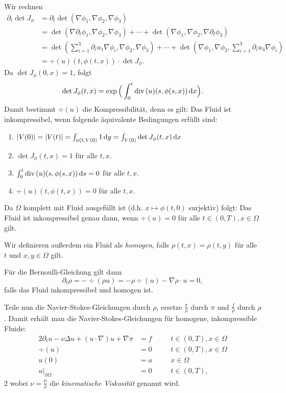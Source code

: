 Wir rechnen
\begin{align*}
  \partial_t \det J_\phi
  &= \partial_t \det (\nabla \phi_1, \nabla \phi_2, \nabla \phi_3) \\
  &= \det (\nabla \partial_t \phi_1, \nabla \phi_2, \nabla \phi_3) + \cdots  +  \det(\nabla\phi_1, \nabla\phi_2, \nabla\partial_t \phi_3) \\
  &= \det( \sum_{i = 1}^3 \partial_i u_1 \nabla \phi_i, \nabla\phi_2, \nabla \phi_3) + \cdots + \det(\nabla\phi_1, \nabla\phi_2, \sum_{i = 1}^3 \partial_i u_3  \nabla \phi_i) \\
  &= \div(u)(t,\phi(t,x)) \cdot \det J_\phi.
\end{align*}
Da $\det J_\phi(0,x) = 1$, folgt 
$$
\det J_\phi(t,x) = \exp\Big( \int_0^t \mathrm{div\,} (u)(s,\phi(s,x))\, {\operatorname{d}\!{x}} \Big).
$$
Damit bestimmt $\div(u)$ die Kompressibilität, denn es gilt:
Das Fluid ist inkompressibel, wenn folgende äquivalente Bedingungen erfüllt sind:
\begin{enumerate}[1)]
  \item $|V(0)| = |V(t)| = \int_{\phi(t,V(0)} 1 \, {\operatorname{d}\!{y}} = \int_{V(0)} \det J_\phi(t,x) \, {\operatorname{d}\!{x}}$
  \item $\det J_\phi(t,x) = 1$ für alle $t, x$.
  \item $\int_0^t \mathrm{div\,} (u)(s,\phi(s,x)) \, {\operatorname{d}\!{s}} = 0$ für alle $t,x$.
  \item $\div(u)(t,\phi(t,x)) = 0$ für alle $t,x$.
\end{enumerate}
Da $\Omega$ komplett mit Fluid ausgefüllt ist (d.h. $x \mapsto \phi(t,0)$ surjektiv) folgt: Das Fluid ist inkompressibel genau dann, wenn $\div(u) = 0$ für alle $t \in (0,T), x \in \Omega$ gilt.

Wir definieren außerdem ein Fluid als \emph{homogen}, falls $\rho(t,x) = \rho(t,y)$ für alle $t$ und $x,y \in \Omega$ gilt.

Für die Bernoulli-Gleichung gilt dann
$$
\partial_t \rho = -\div(\rho u) = -\rho \div(u) - \nabla \rho \cdot u = 0,
$$
falls das Fluid inkompressibel und homogen ist.

Teile nun die Navier-Stokes-Gleichungen durch $\rho$, ersetze $\frac{\pi}{\rho}$ durch $\pi$ und $\frac{f}{\rho}$ durch $\rho$.
Damit erhält man die Navier-Stokes-Gleichungen für homogene, inkompressible Fluide:
\begin{alignat*}{2}
  \partial_t u - \nu \Delta u + (u \cdot \nabla) u + \nabla \pi &= f \quad&&t \in (0,T), x \in \Omega \\
  \div(u) &= 0 \quad&&t \in (0,T), x \in \Omega\\
  u(0) &= a \quad&&x \in \Omega \\
  u|_{\partial\Omega} &= 0  \quad&&t \in (0,T),
\end{alignat*}{2}
wobei $\nu = \frac{\mu}{\rho}$ die \emph{kinematische Viskosität} genannt wird.

